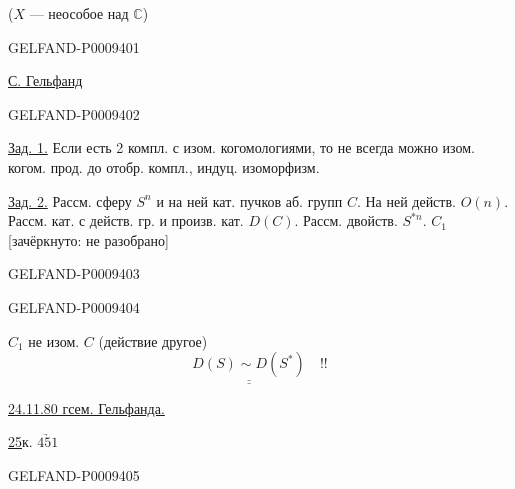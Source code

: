 ($X$ --- неособое над $\mathbb C$)

\begin{GelfandAdjacentEvidence}{GELFAND-P000940}{1}

\underline{С. Гельфанд}

\end{GelfandAdjacentEvidence}
\begin{GelfandAdjacentEvidence}{GELFAND-P000940}{2}


\underline{Зад. 1.} Если есть 2 компл. с изом. когомологиями, то не всегда можно изом. когом. прод. до отобр. компл., индуц. изоморфизм.

\underline{Зад. 2.} Рассм. сферу $S^n$ и на ней кат. пучков аб. групп $C$. На ней действ. $O(n)$.
Рассм. кат. с действ. гр. и произв. кат. $D(C)$. Рассм. двойств. $S^{*n}$. $C_1$ [зачёркнуто: не разобрано]
\end{GelfandAdjacentEvidence}
\begin{GelfandAdjacentEvidence}{GELFAND-P000940}{3}

\end{GelfandAdjacentEvidence}
\begin{GelfandAdjacentEvidence}{GELFAND-P000940}{4}


$C_1$ не изом. $C$ (действие другое)
\[
 \underline{\underline{D(S)\sim D(S^*)}}\quad!!
\]

\underline{24.11.80 г}\qquad\underline{сем. Гельфанда.}


\underline{25}\quad к. \(\underrightarrow{451}\)
\end{GelfandAdjacentEvidence}
\begin{GelfandAdjacentEvidence}{GELFAND-P000940}{5}

\end{GelfandAdjacentEvidence}

